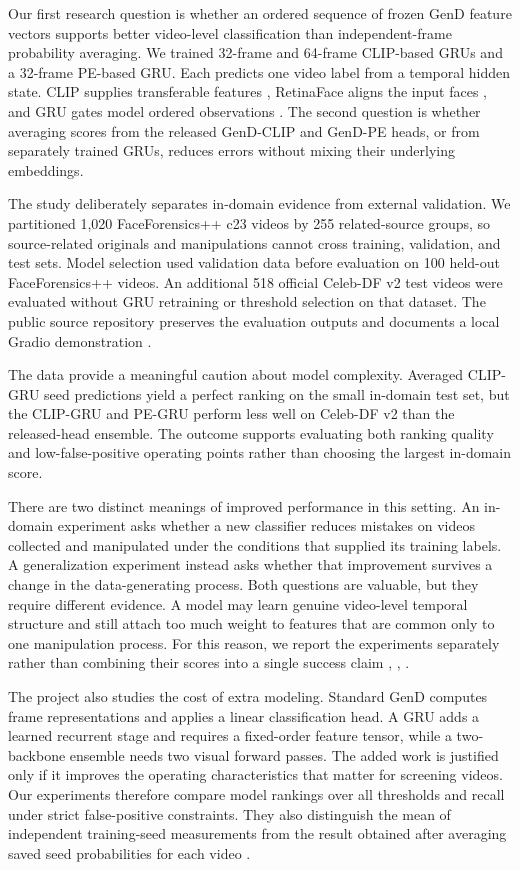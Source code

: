 \documentclass[conference,10pt]{IEEEtran}
\begin{document}
Our first research question is whether an ordered sequence of frozen GenD feature vectors supports better video-level classification than independent-frame probability averaging. We trained 32-frame and 64-frame CLIP-based GRUs and a 32-frame PE-based GRU. Each predicts one video label from a temporal hidden state. CLIP supplies transferable features \cite{radford2021}, RetinaFace aligns the input faces \cite{deng2020}, and GRU gates model ordered observations \cite{cho2014}. The second question is whether averaging scores from the released GenD-CLIP and GenD-PE heads, or from separately trained GRUs, reduces errors without mixing their underlying embeddings.

The study deliberately separates in-domain evidence from external validation. We partitioned 1,020 FaceForensics++ c23 videos by 255 related-source groups, so source-related originals and manipulations cannot cross training, validation, and test sets. Model selection used validation data before evaluation on 100 held-out FaceForensics++ videos. An additional 518 official Celeb-DF v2 test videos were evaluated without GRU retraining or threshold selection on that dataset. The public source repository preserves the evaluation outputs and documents a local Gradio demonstration \cite{capstone2026}.

The data provide a meaningful caution about model complexity. Averaged CLIP-GRU seed predictions yield a perfect ranking on the small in-domain test set, but the CLIP-GRU and PE-GRU perform less well on Celeb-DF v2 than the released-head ensemble. The outcome supports evaluating both ranking quality and low-false-positive operating points rather than choosing the largest in-domain score.

There are two distinct meanings of improved performance in this setting. An in-domain experiment asks whether a new classifier reduces mistakes on videos collected and manipulated under the conditions that supplied its training labels. A generalization experiment instead asks whether that improvement survives a change in the data-generating process. Both questions are valuable, but they require different evidence. A model may learn genuine video-level temporal structure and still attach too much weight to features that are common only to one manipulation process. For this reason, we report the experiments separately rather than combining their scores into a single success claim \cite{yermakov2026}, \cite{rossler2019}, \cite{li2020}.

The project also studies the cost of extra modeling. Standard GenD computes frame representations and applies a linear classification head. A GRU adds a learned recurrent stage and requires a fixed-order feature tensor, while a two-backbone ensemble needs two visual forward passes. The added work is justified only if it improves the operating characteristics that matter for screening videos. Our experiments therefore compare model rankings over all thresholds and recall under strict false-positive constraints. They also distinguish the mean of independent training-seed measurements from the result obtained after averaging saved seed probabilities for each video \cite{capstone2026}.
\end{document}
